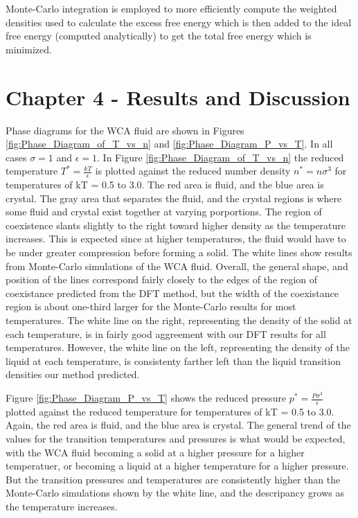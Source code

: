 \documentclass[double,12pt]{beavtex}
\begin{document}
Monte-Carlo integration is employed to more efficiently 
compute the weighted densities used to calculate the excess free energy which is then 
added to the ideal free energy (computed analytically) to get the total free energy 
which is minimized. 

\newpage

\section{Chapter 4 - Results and Discussion}

Phase diagrams for the WCA fluid are shown in Figures \ref{fig:Phase_Diagram_of_T_vs_n} 
and \ref{fig:Phase_Diagram_P_vs_T}. In all cases $\sigma=1$ and $\epsilon=1$. 
In Figure \ref{fig:Phase_Diagram_of_T_vs_n} the reduced temperature $T^*=\frac{kT}{\epsilon}$ 
is plotted against the reduced number density $n^*=n\sigma^3$ for temperatures of kT = 0.5 to 3.0. 
The red area is fluid, and the blue area is crystal. The gray area that separates the fluid, 
and the crystal regions is where some fluid and crystal exist together at varying porportions. 
The region of coexistence slants slightly to the right toward higher density as the temperature 
increases. This is expected since at higher temperatures, the fluid would have to be under 
greater compression before forming a solid. The white lines show results from Monte-Carlo 
simulations of the WCA fluid. Overall, the general shape, and position of the lines correspond
fairly closely to the edges of the region of coexistance predicted from the DFT method, 
but the width of the coexistance region is about one-third larger for the Monte-Carlo results 
for most temperatures. The white line on the right, representing the density of the solid at 
each temperature, is in fairly good aggreement with our DFT results for all temperatures. 
However, the white line on the left, representing the density of the liquid at each temperature, 
is consistenty farther left than the liquid transition densities our method predicted.

Figure \ref{fig:Phase_Diagram_P_vs_T} shows the reduced pressure $p^*=\frac{P\sigma^3}{\epsilon}$ 
plotted against the reduced temperature for temperatures of kT = 0.5 to 3.0. Again, the red area 
is fluid, and the blue area is crystal. The general trend of the values for the transition 
temperatures and pressures is what would be expected, with the WCA fluid becoming a solid at
a higher pressure for a higher temperatuer, or becoming a liquid at a higher temperature 
for a higher pressure. But the transition pressures and temperatures are consistently higher 
than the Monte-Carlo simulations shown by the white line, and the descripancy grows as 
the temperature increases.
\end{document}
